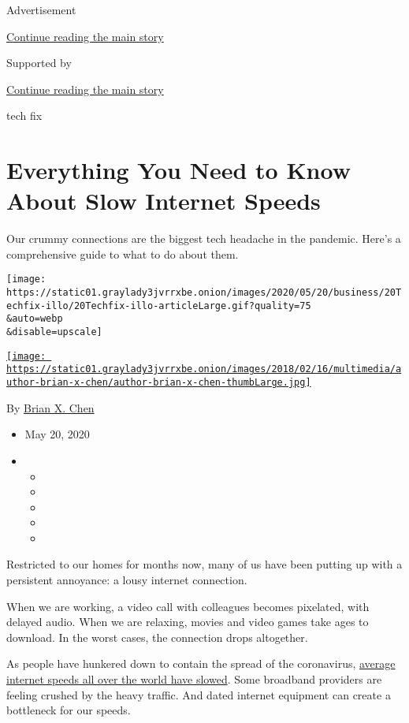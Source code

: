 Advertisement

\protect\hyperlink{after-top}{Continue reading the main story}

Supported by

\protect\hyperlink{after-sponsor}{Continue reading the main story}

tech fix

\hypertarget{everything-you-need-to-know-about-slow-internet-speeds}{%
\section{Everything You Need to Know About Slow Internet
Speeds}\label{everything-you-need-to-know-about-slow-internet-speeds}}

Our crummy connections are the biggest tech headache in the pandemic.
Here's a comprehensive guide to what to do about them.

\texttt{[image: https://static01.graylady3jvrrxbe.onion/images/2020/05/20/business/20Techfix-illo/20Techfix-illo-articleLarge.gif?quality=75\\\&auto=webp\\\&disable=upscale]}

\href{https://www.nytimes3xbfgragh.onion/by/brian-x-chen}{\texttt{[image: https://static01.graylady3jvrrxbe.onion/images/2018/02/16/multimedia/author-brian-x-chen/author-brian-x-chen-thumbLarge.jpg]}}

By \href{https://www.nytimes3xbfgragh.onion/by/brian-x-chen}{Brian X.
Chen}

\begin{itemize}
\item
  May 20, 2020
\item
  \begin{itemize}
  \item
  \item
  \item
  \item
  \item
  \end{itemize}
\end{itemize}

Restricted to our homes for months now, many of us have been putting up
with a persistent annoyance: a lousy internet connection.

When we are working, a video call with colleagues becomes pixelated,
with delayed audio. When we are relaxing, movies and video games take
ages to download. In the worst cases, the connection drops altogether.

As people have hunkered down to contain the spread of the coronavirus,
\href{https://www.nytimes3xbfgragh.onion/2020/03/26/business/coronavirus-internet-traffic-speed.html}{average
internet speeds all over the world have slowed}. Some broadband
providers are feeling crushed by the heavy traffic. And dated internet
equipment can create a bottleneck for our speeds.

